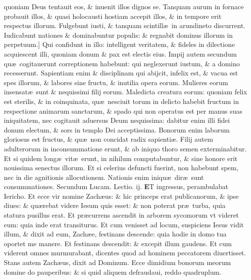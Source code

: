 \documentclass[a5paper,10pt]{book}
\def\leftmarginnote{%
	\lrmarginnote{\hskip -\marginparsep \hskip -6.5em}}
\def\rightmarginnote{%
	\lrmarginnote{\hskip\columnwidth \hskip -1em}}
\def\ae{æ}
\begin{document}
\begin{multicols*}{2}
quoniam Deus tentauit eos, \& inuenit illos dignos se.
Tanquam aurum in fornace probauit illos, \& quasi holocausti hostiam accepit illos, \& in tempore erit respectus illorum.
Fulgebunt iusti, \& tanquam scintill\ae \ in arundineto discurrent. Iudicabunt nationes \& dominabuntur populis: \& regnabit dominus illorum in perpetuum.]
Qui\rightmarginnote{B} confidunt in illo: intelligent veritatem, \& fideles in dilectione acquiescent illi, quoniam donum \& pax est electis eius.
Impij autem secundum qu\ae \ cogitauerunt correptionem habebunt: qui neglexerunt iustum, \& a domino recesserunt.
Sapientiam enim \& disciplinam qui abijcit, infelix est, \& vacua est spes illorum, \& labores sine fructu, \& inutilia opera eorum.
Mulieres eorum insensat\ae \ sunt \& nequissimi filij eorum. Maledicta creatura eorum: quoniam felix est sterilis, \& in coinquinata, qu\ae \ nesciuit torum in delicto habebit fructum in respectione animarum sanctarum, \& spado qui non operatus est per manus suas iniquitatem, nec cogitauit aduersus Deum nequissima: dabitur enim illi fidei donum electum, \& sors in templo Dei acceptissima.
Bonorum enim laborum gloriosus est fructus, \& qu\ae \ non concidat radix sapienti\ae .
Filij autem adulterorum in inconsummatione erunt, \& ab iniquo thoro semen exterminabitur.
Et si quidem long\ae \ vit\ae \ erunt, in nihilum computabuntur, \& sine honore erit nouissima senectus illorum.
Et si celerius defuncti fuerint, non habebunt spem, nec in die agnitionis allocutionem. Nationis enim iniqu\ae \ dir\ae \ sunt consummationes.
\newline \color{red} Secundum Lucam. \hfill Lectio. ij. \color{black}
\vspace{-.25em}
\lettrine[lines=2]{\bfseries \color{red} E}{}\textdagger T\leftmarginnote{\begin{flushright}c. 19.\\a\end{flushright}} ingressus, perambulabat Iericho.
Et ecce vir nomine Zach\ae us: \& hic princeps erat publicanorum, \& ipse diues: \& qu\ae rebat videre Iesum quis esset: \& non poterat pr\ae \ turba, quia statura pusillus erat.
Et pr\ae currens ascendit in arborem sycomorum vt videret eum: quia inde erat transiturus. Et cum venisset ad locum, suspiciens Iesus vidit illum, \& dixit ad eum, Zach\ae e, festinans descende: quia hodie in domo tua oportet me manere.
Et festinans descendit: \& excepit illum gaudens. Et cum viderent omnes murmurabant, dicentes quod ad hominem peccatorem diuertisset.
Stans autem Zach\ae us, dixit ad Dominum. Ecce dimidium bonorum meorum domine do pauperibus: \& si quid aliquem defraudaui, reddo quadruplum.

\end{multicols*}
\end{document}
